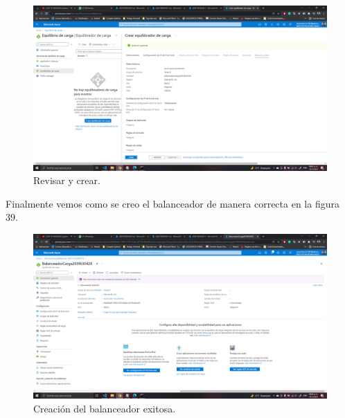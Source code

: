 \documentclass[11pt]{article}
\begin{document}
			\begin{figure}[H]
				\centering
				\includegraphics[scale=0.34]{resources/creacionBalanceador18.png}
				\caption{Revisar y crear.}\label{fig:picture}
			\end{figure}
			Finalmente vemos como se creo el balanceador de manera correcta en la figura 39.
			\begin{figure}[H]
				\centering
				\includegraphics[scale=0.34]{resources/creacionBalanceadorF.png}
				\caption{Creación del balanceador exitosa.}\label{fig:picture}
			\end{figure}
\end{document}

